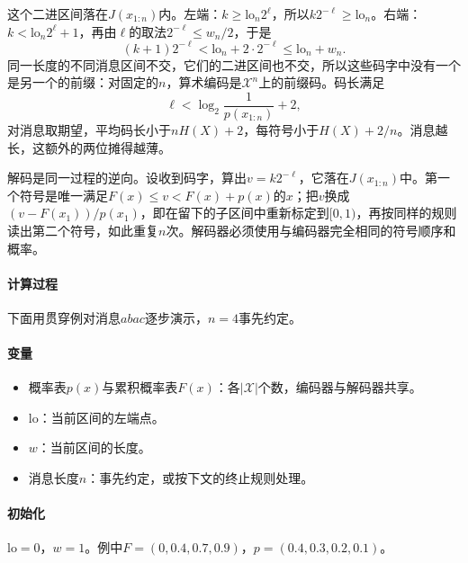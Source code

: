 这个二进区间落在$J(x_{1:n})$内。左端：$k\geq\mathrm{lo}_n2^{\ell}$，所以$k2^{-\ell}\geq\mathrm{lo}_n$。右端：$k<\mathrm{lo}_n2^{\ell}+1$，再由$\ell$的取法$2^{-\ell}\leq w_n/2$，于是
\[
 (k+1)2^{-\ell}<\mathrm{lo}_n+2\cdot2^{-\ell}\leq\mathrm{lo}_n+w_n .
\]
同一长度的不同消息区间不交，它们的二进区间也不交，所以这些码字中没有一个是另一个的前缀：对固定的$n$，算术编码是$\mathcal{X}^n$上的前缀码。码长满足
\begin{equation}
 \ell<\log_2\frac{1}{p(x_{1:n})}+2 ,
 \label{eq:lossless-arith-length}
\end{equation}
对消息取期望，平均码长小于$nH(X)+2$，每符号小于$H(X)+2/n$。消息越长，这额外的两位摊得越薄。

解码是同一过程的逆向。设收到码字，算出$v=k2^{-\ell}$，它落在$J(x_{1:n})$中。第一个符号是唯一满足$F(x)\leq v<F(x)+p(x)$的$x$；把$v$换成$(v-F(x_1))/p(x_1)$，即在留下的子区间中重新标定到$[0,1)$，再按同样的规则读出第二个符号，如此重复$n$次。解码器必须使用与编码器完全相同的符号顺序和概率。

\paragraph{计算过程}
下面用贯穿例对消息$abac$逐步演示，$n=4$事先约定。

\paragraph{变量}
\begin{itemize}
 \item 概率表$p(x)$与累积概率表$F(x)$：各$\lvert\mathcal{X}\rvert$个数，编码器与解码器共享。
 \item $\mathrm{lo}$：当前区间的左端点。
 \item $w$：当前区间的长度。
 \item 消息长度$n$：事先约定，或按下文的终止规则处理。
\end{itemize}

\paragraph{初始化}
$\mathrm{lo}=0$，$w=1$。例中$F=(0,0.4,0.7,0.9)$，$p=(0.4,0.3,0.2,0.1)$。

